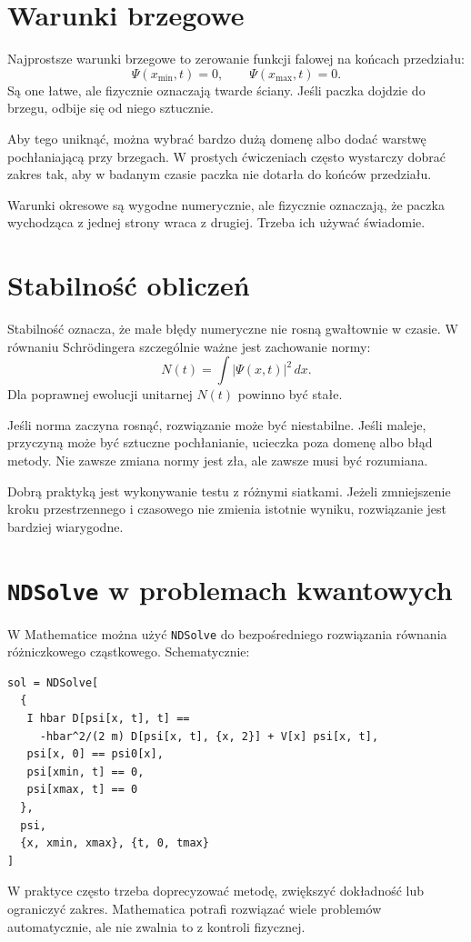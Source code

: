 \section{Warunki brzegowe}

Najprostsze warunki brzegowe to zerowanie funkcji falowej na końcach przedziału:
\begin{equation}
    \Psi(x_{\min},t)=0,
    \qquad
    \Psi(x_{\max},t)=0.
\end{equation}
Są one łatwe, ale fizycznie oznaczają twarde ściany. Jeśli paczka dojdzie do brzegu, odbije się od niego sztucznie.

Aby tego uniknąć, można wybrać bardzo dużą domenę albo dodać warstwę pochłaniającą przy brzegach. W prostych ćwiczeniach często wystarczy dobrać zakres tak, aby w badanym czasie paczka nie dotarła do końców przedziału.

Warunki okresowe są wygodne numerycznie, ale fizycznie oznaczają, że paczka wychodząca z jednej strony wraca z drugiej. Trzeba ich używać świadomie.

\section{Stabilność obliczeń}

Stabilność oznacza, że małe błędy numeryczne nie rosną gwałtownie w czasie. W równaniu Schrödingera szczególnie ważne jest zachowanie normy:
\begin{equation}
    N(t)=\int |\Psi(x,t)|^2\,dx.
\end{equation}
Dla poprawnej ewolucji unitarnej \(N(t)\) powinno być stałe.

Jeśli norma zaczyna rosnąć, rozwiązanie może być niestabilne. Jeśli maleje, przyczyną może być sztuczne pochłanianie, ucieczka poza domenę albo błąd metody. Nie zawsze zmiana normy jest zła, ale zawsze musi być rozumiana.

Dobrą praktyką jest wykonywanie testu z różnymi siatkami. Jeżeli zmniejszenie kroku przestrzennego i czasowego nie zmienia istotnie wyniku, rozwiązanie jest bardziej wiarygodne.

\section{\texttt{NDSolve} w problemach kwantowych}

W Mathematice można użyć \texttt{NDSolve} do bezpośredniego rozwiązania równania różniczkowego cząstkowego. Schematycznie:
\begin{verbatim}
sol = NDSolve[
  {
   I hbar D[psi[x, t], t] ==
     -hbar^2/(2 m) D[psi[x, t], {x, 2}] + V[x] psi[x, t],
   psi[x, 0] == psi0[x],
   psi[xmin, t] == 0,
   psi[xmax, t] == 0
  },
  psi,
  {x, xmin, xmax}, {t, 0, tmax}
]
\end{verbatim}
W praktyce często trzeba doprecyzować metodę, zwiększyć dokładność lub ograniczyć zakres. Mathematica potrafi rozwiązać wiele problemów automatycznie, ale nie zwalnia to z kontroli fizycznej.

